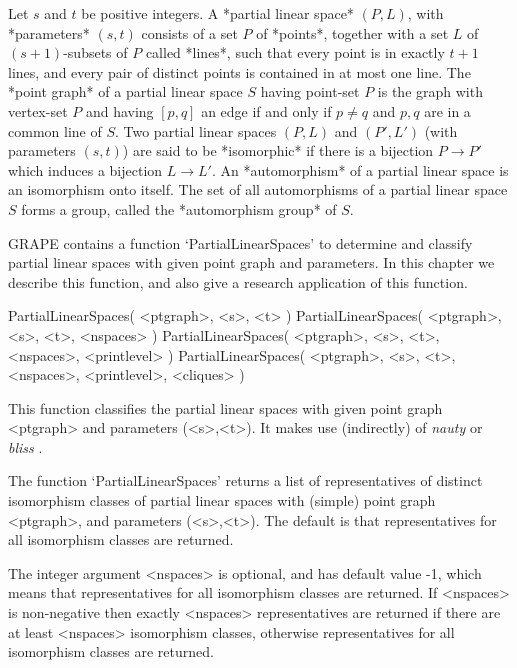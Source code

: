 %
%
%
%
\def\GRAPE{\sf GRAPE}
\def\nauty{\it nauty}
\def\bliss{\it bliss}
\def\G{\Gamma}
\def\Aut{{\rm Aut}\,}
\def\x{\times}


Let $s$ and  $t$  be positive integers. A *partial linear space*
$(P,L)$, with *parameters* $(s,t)$ consists of a set $P$ of *points*,
together with a set $L$ of $(s+1)$-subsets of $P$ called *lines*,
such that every point is in exactly $t+1$ lines, and every pair of
distinct points is contained in at most one line.  The *point graph*
of a partial linear space $S$ having point-set $P$ is the graph with
vertex-set $P$ and having $[p,q]$ an edge if and only if $p\not=q$ and
$p,q$ are in a common line of $S$. Two partial linear spaces $(P,L)$
and $(P',L')$ (with parameters $(s,t)$) are said to be *isomorphic*
if there is a bijection $P\to P'$ which induces a bijection $L\to L'$.
An *automorphism* of a partial linear space is an isomorphism onto itself.
The set of all automorphisms of a partial linear space $S$ forms a group,
called the *automorphism group* of $S$.

{\GRAPE} contains a function `PartialLinearSpaces' to determine and
classify partial linear spaces with given point graph and parameters.
In this chapter we describe this function, and also give a research
application of this function.


\>PartialLinearSpaces( <ptgraph>, <s>, <t> )
\>PartialLinearSpaces( <ptgraph>, <s>, <t>, <nspaces> )
\>PartialLinearSpaces( <ptgraph>, <s>, <t>, <nspaces>, <printlevel> )
\>PartialLinearSpaces( <ptgraph>, <s>, <t>, <nspaces>, <printlevel>, <cliques> )

This function classifies the partial linear spaces with given point
graph <ptgraph> and parameters (<s>,<t>). It makes use (indirectly)
of {\nauty} \cite{Nau90,MP14} or {\bliss} \cite{JK07}.

The function `PartialLinearSpaces' returns a list of representatives
of distinct isomorphism classes of partial linear spaces with (simple)
point graph <ptgraph>, and parameters (<s>,<t>). The default is that
representatives for all isomorphism classes are returned.

The integer argument <nspaces> is optional, and has default value -1,
which means that representatives for all isomorphism classes are
returned. If <nspaces> is non-negative then exactly <nspaces>
representatives are returned if there are at least <nspaces>
isomorphism classes, otherwise representatives for all isomorphism
classes are returned.

